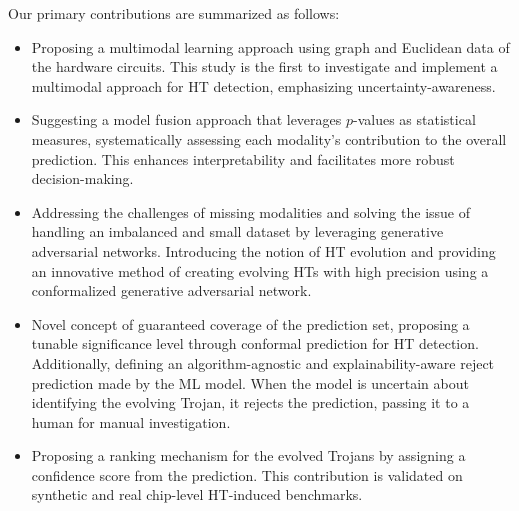 Our primary contributions are summarized as follows:

\begin{itemize}
\item Proposing a multimodal learning approach using graph and Euclidean data of the hardware circuits. This study is the first to investigate and implement a multimodal approach for HT detection, emphasizing uncertainty-awareness.
\item Suggesting a model fusion approach that leverages $p$-values as statistical measures, systematically assessing each modality's contribution to the overall prediction. This enhances interpretability and facilitates more robust decision-making.
\item Addressing the challenges of missing modalities and solving the issue of handling an imbalanced and small dataset by leveraging generative adversarial networks.
Introducing the notion of HT evolution and providing an innovative method of creating evolving HTs with high precision using a conformalized generative adversarial network.
\item Novel concept of guaranteed coverage of the prediction set, proposing a tunable significance level through conformal prediction for HT detection. Additionally, defining an algorithm-agnostic and explainability-aware reject prediction made by the ML model. When the model is uncertain about identifying the evolving Trojan, it rejects the prediction, passing it to a human for manual investigation.
\item Proposing a ranking mechanism for the evolved Trojans by assigning a confidence score from the prediction. This contribution is validated on synthetic and real chip-level HT-induced benchmarks.
\end{itemize}


\endgroup